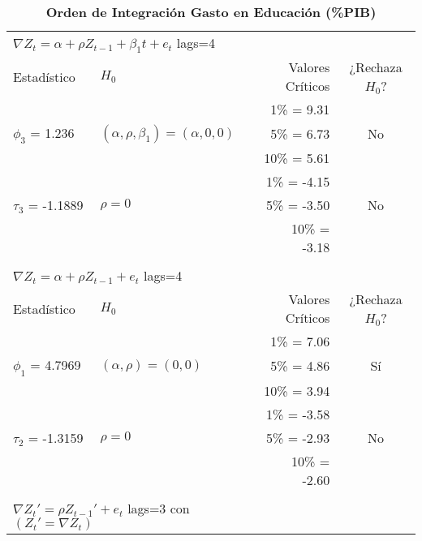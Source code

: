 \begin{table}[ht]
\caption{\textbf{Orden de Integración Gasto en Educación (\%PIB)}}
\centering
	\begin{tabular}{llrc}
	\multicolumn{2}{l}{$\nabla Z_t = \alpha + \rho Z_{t-1} + \beta_1 t + e_t$ lags=4} \\
	\cline{1-2}
		Estadístico    			& $H_0$ 							& Valores Críticos 	& ¿Rechaza $H_0$? \\
		\hline
							&								& 1\%   = 9.31		&			\\
		 $\phi_3$ = 1.236		& $(\alpha, \rho, \beta_1)=(\alpha,0,0)$     & 5\%   = 6.73		&       No		\\
							&  								& 10\% = 5.61		&       		\\
	\cline{1-4}				
							&								& 1\%   = -4.15		&			\\
		 $\tau_3$ = -1.1889		& $\rho=0$						& 5\%   = -3.50		&       No		\\
							&  								& 10\% = -3.18		&       		\\
	\firsthline
							&								&				&			\\
	\multicolumn{2}{l}{$\nabla Z_t = \alpha + \rho Z_{t-1} + e_t$ lags=4} \\
	\cline{1-2}
		Estadístico    			& $H_0$ 							& Valores Críticos 	& ¿Rechaza $H_0$? \\
		\hline
							&								& 1\%   = 7.06		&			\\
		 $\phi_1$ = 4.7969		& $(\alpha, \rho)=(0,0)$     			& 5\%   = 4.86		&       Sí		\\
							&  								& 10\% = 3.94		&       		\\
	\cline{1-4}				
							&								& 1\%   = -3.58		&			\\
		 $\tau_2$ = -1.3159		& $\rho=0$						& 5\%   = -2.93		&       No		\\
							&  								& 10\% = -2.60		&       		\\
	\firsthline
							&								&				&			\\
	\multicolumn{2}{l}{$\nabla Z_t' = \rho Z_{t-1}' + e_t$ lags=3 con $(Z_t'=\nabla Z_t)$} \\

\end{tabular}
\end{table}
